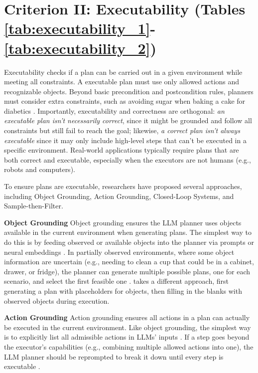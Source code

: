 \section{Criterion II: Executability (Tables \ref{tab:executability_1}-\ref{tab:executability_2})} \label{sec:executability}

Executability checks if a plan can be carried out in a given environment while meeting all constraints. A executable plan must use only allowed actions and recognizable objects. Beyond basic precondition and postcondition rules, planners must consider extra constraints, such as avoiding sugar when baking a cake for diabetics \cite{yuan2023distilling}. Importantly, executability and correctness are orthogonal: \emph{an executable plan isn’t necessarily correct}, since it might be grounded and follow all constraints but still fail to reach the goal; likewise, \emph{a correct plan isn’t always executable} since it may only include high-level steps that can’t be executed in a specific environment. Real-world applications typically require plans that are both correct and executable, especially when the executors are not humans (e.g., robots and computers).

To ensure plans are executable, researchers have proposed several approaches, including Object Grounding, Action Grounding, Closed-Loop Systems, and Sample-then-Filter. \smallskip

\noindent\textbf{Object Grounding} Object grounding ensures the LLM planner uses objects available in the current environment when generating plans. The simplest way to do this is by feeding observed or available objects into the planner via prompts \citep{huang2022inner, song2023llm, lin2023grounded, singh2023progprompt} or neural embeddings \cite{sharma2021skill, ahn2022can}. In partially observed environments, where some object information are uncertain (e.g., needing to clean a cup that could be in a cabinet, drawer, or fridge), the planner can generate multiple possible plans, one for each scenario, and select the first feasible one \citep{prasad2023adapt, dagan2023dynamic, zhao2024large}. \citet{sun2024adaplanner} takes a different approach, first generating a plan with placeholders for objects, then filling in the blanks with observed objects during execution.\smallskip

\noindent\textbf{Action Grounding} Action grounding ensures all actions in a plan can actually be executed in the current environment. Like object grounding, the simplest way is to explicitly list all admissible actions in LLMs’ inputs \cite{singh2023progprompt}. If a step goes beyond the executor’s capabilities (e.g., combining multiple allowed actions into one), the LLM planner should be reprompted to break it down until every step is executable \citep{prasad2023adapt}. 

